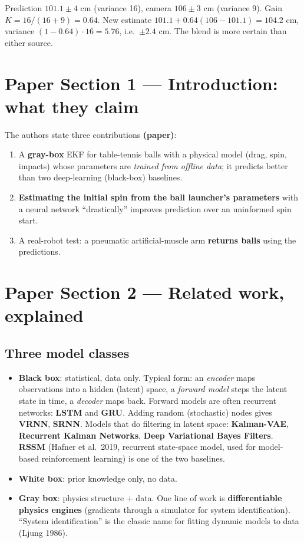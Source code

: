 \documentclass[11pt,a4paper]{article}
\begin{document}
\begin{toy}
Prediction $101.1\pm4$ cm (variance 16), camera $106\pm3$ cm (variance 9). Gain $K=16/(16+9)=0.64$. New estimate $101.1+0.64(106-101.1)=104.2$ cm, variance $(1-0.64)\cdot16=5.76$, i.e.\ $\pm2.4$ cm.
The blend is more certain than either source.
\end{toy}

\section{Paper Section 1 --- Introduction: what they claim}
The authors state three contributions \textbf{(paper)}:
\begin{enumerate}
\item A \textbf{gray-box} EKF for table-tennis balls with a physical model (drag, spin, impacts) whose parameters are \emph{trained from offline data}; it predicts better than two deep-learning (black-box) baselines.
\item \textbf{Estimating the initial spin from the ball launcher's parameters} with a neural network ``drastically'' improves prediction over an uninformed spin start.
\item A real-robot test: a pneumatic artificial-muscle arm \textbf{returns balls} using the predictions.
\end{enumerate}

\section{Paper Section 2 --- Related work, explained}
\subsection{Three model classes}
\begin{itemize}
\item \textbf{Black box}: statistical, data only. Typical form: an \emph{encoder} maps observations into a hidden (latent) space, a \emph{forward model} steps the latent state in time, a \emph{decoder} maps back.
Forward models are often recurrent networks: \textbf{LSTM} and \textbf{GRU}. Adding random (stochastic) nodes gives \textbf{VRNN}, \textbf{SRNN}. Models that do filtering in latent space: \textbf{Kalman-VAE}, \textbf{Recurrent Kalman Networks}, \textbf{Deep Variational Bayes Filters}.
\textbf{RSSM} (Hafner et al.\ 2019, recurrent state-space model, used for model-based reinforcement learning) is one of the two baselines.
\item \textbf{White box}: prior knowledge only, no data.
\item \textbf{Gray box}: physics structure + data. One line of work is \textbf{differentiable physics engines} (gradients through a simulator for system identification).
``System identification'' is the classic name for fitting dynamic models to data (Ljung 1986).
\end{itemize}
\end{document}
